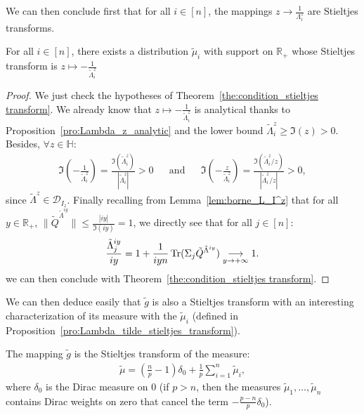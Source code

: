 \documentclass[a4papaer, titlepage]{book}
\begin{document}
We can then conclude first that for all $i \in [n]$, the mappings $z \to \frac{1}{\Lambda^z_i}$ are Stieltjes transforms.
\begin{proposition}\label{pro:Lambda_tilde_stieltjes_transform}
  For all $i \in [n]$, there exists a distribution $\tilde \mu_i$ with support on $\mathbb R_+$ whose Stieltjes transform is $z \mapsto -\frac{1}{\tilde \Lambda_i^z}$
\end{proposition}
\begin{proof}
  We just check the hypotheses of Theorem~\ref{the:condition_stieltjes transform}. We already know that $z \mapsto -\frac{1}{\tilde \Lambda^z_i}$ is analytical thanks to Proposition~\ref{pro:Lambda_z_analytic} and the lower bound $\tilde \Lambda^z_i \geq \Im(z)>0$. Besides, $\forall z \in \mathbb H$:
  \begin{align*}
    \Im \left(-\frac{1}{\tilde \Lambda^z_i}\right) = \frac{\Im(\tilde \Lambda^z_i)}{|\tilde \Lambda^z_i|} >0&
    &\text{and}&
    &\Im \left(-\frac{z}{\tilde \Lambda^z_i}\right) = \frac{\Im(\tilde \Lambda^z_i/z)}{|\tilde \Lambda^z_i/z|} >0,
  \end{align*}
  since $\tilde \Lambda^z \in \mathcal D_{I_z}$.
  Finally recalling from Lemma~\ref{lem:borne_L_I^z} that for all $y \in \mathbb R_+$, $\|\tilde Q^{\tilde \Lambda^{iy}}\| \leq \frac{|iy|}{\Im(iy)} = 1$, we directly see that for all $j \in [n]$:
  \begin{align*}
    \frac{\tilde \Lambda^{iy}_j}{iy} = 1 + \frac{1}{iyn} \operatorname{Tr}(\Sigma_j \tilde Q^{\tilde \Lambda^{iy}}) \underset{y \to +\infty}{\longrightarrow} 1.
  \end{align*}
  we can then conclude with Theorem~\ref{the:condition_stieltjes transform}.
\end{proof}
We can then deduce easily that $\tilde g$ is also a Stieltjes transform with an interesting characterization of its measure with the $\tilde \mu_i$ (defined in Proposition~\ref{pro:Lambda_tilde_stieltjes_transform}).
\begin{proposition}\label{pro:g_stieltjes}
  The mapping $\tilde g$ is the Stieltjes transform of the measure:
  \begin{align*}
    \tilde \mu = \left(\frac{n}{p} - 1\right) \delta_{0} + \frac{1}{p} \sum_{i=1}^n \tilde \mu_i,
  \end{align*}
  where $\delta_0$ is the Dirac measure on $0$ (if $p>n$, then the measures $\tilde \mu_1, \ldots, \tilde \mu_n$ contains Dirac weights on zero that cancel the term $-\frac{p-n}{p} \delta_{0}$).
\end{proposition}
\end{document}
